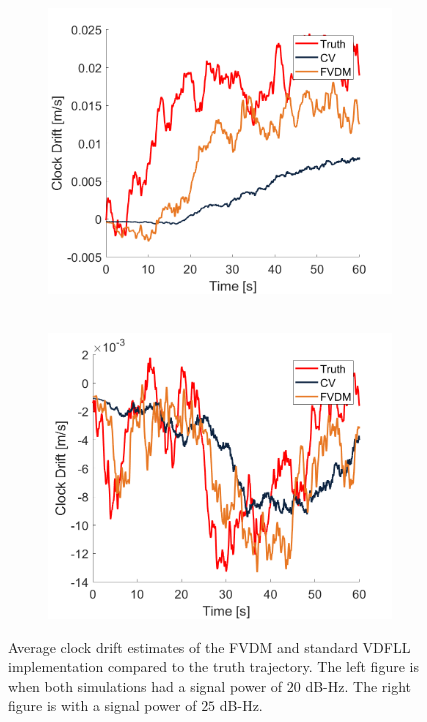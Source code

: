 \begin{figure}[!ht]
    \begin{subfigure}{.45\textwidth}
        \centering
        \includegraphics[width=1\linewidth]{Figures/straight/25/CLOCKDRIFT.png}\
    \end{subfigure}
    \begin{subfigure}{.45\textwidth}
        \centering
        \includegraphics[width=1\linewidth]{Figures/straight/35/CLOCKDRIFT.png}
    \end{subfigure}
    \caption{Average clock drift estimates of the FVDM and standard VDFLL implementation compared to the truth trajectory. The left figure is when both simulations had a signal power of \(20\) dB-Hz. The right figure is with a signal power of \(25\) dB-Hz.}\label{fig:Clocks2}
\end{figure}

